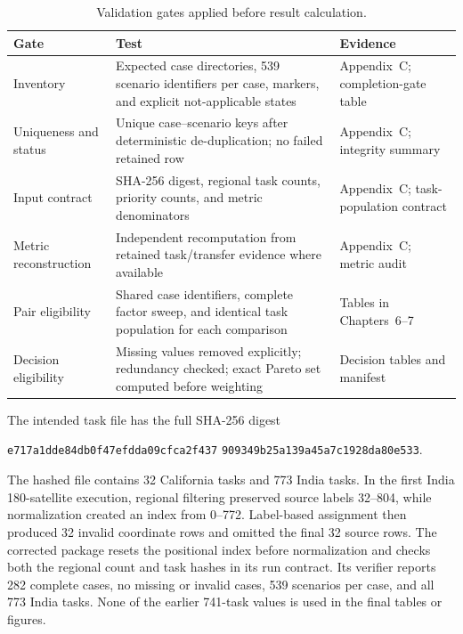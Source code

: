 \begin{table}[htbp]
\centering
\small
\caption{Validation gates applied before result calculation.}
\label{tab:validation_gate}
\begin{tabularx}{\textwidth}{L{0.24\textwidth}Y L{0.21\textwidth}}
\toprule
Gate & Test & Evidence \\
\midrule
Inventory & Expected case directories, 539 scenario identifiers per case, markers, and explicit not-applicable states & Appendix~C; completion-gate table \\
Uniqueness and status & Unique case--scenario keys after deterministic de-duplication; no failed retained row & Appendix~C; integrity summary \\
Input contract & SHA-256 digest, regional task counts, priority counts, and metric denominators & Appendix~C; task-population contract \\
Metric reconstruction & Independent recomputation from retained task/transfer evidence where available & Appendix~C; metric audit \\
Pair eligibility & Shared case identifiers, complete factor sweep, and identical task population for each comparison & Tables in Chapters~6--7 \\
Decision eligibility & Missing values removed explicitly; redundancy checked; exact Pareto set computed before weighting & Decision tables and manifest \\
\bottomrule
\end{tabularx}
\end{table}

The intended task file has the full SHA-256 digest
\begin{center}
\small\texttt{e717a1dde84db0f47efdda09cfca2f437}\linebreak
\texttt{909349b25a139a45a7c1928da80e533}.
\end{center}
The hashed file contains 32 California tasks and 773 India tasks. In the first India 180-satellite execution, regional filtering preserved source labels 32--804, while normalization created an index from 0--772. Label-based assignment then produced 32 invalid coordinate rows and omitted the final 32 source rows. The corrected package resets the positional index before normalization and checks both the regional count and task hashes in its run contract. Its verifier reports 282 complete cases, no missing or invalid cases, 539 scenarios per case, and all 773 India tasks. None of the earlier 741-task values is used in the final tables or figures.


